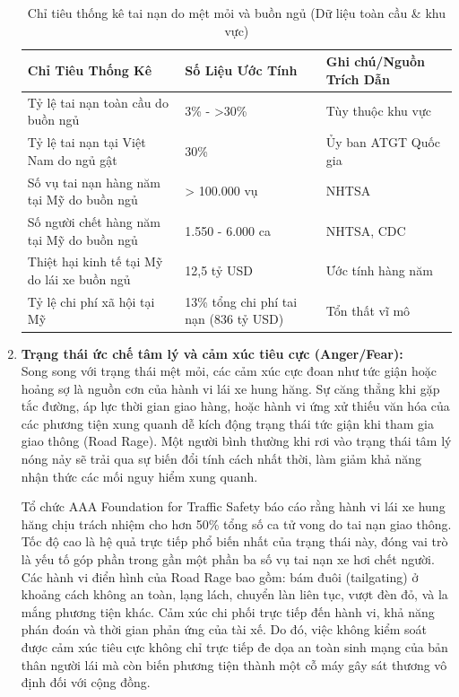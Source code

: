 \documentclass[../DoAn.tex]{subfiles}
\begin{document}
\begin{enumerate}
    \begin{table}[htbp]
    \centering
    \caption{Chỉ tiêu thống kê tai nạn do mệt mỏi và buồn ngủ (Dữ liệu toàn cầu \& khu vực)}
    \begin{tabular}{|p{6cm}|p{4cm}|p{4.5cm}|}
    \hline
    \textbf{Chỉ Tiêu Thống Kê} & \textbf{Số Liệu Ước Tính} & \textbf{Ghi chú/Nguồn Trích Dẫn} \\
    \hline
    Tỷ lệ tai nạn toàn cầu do buồn ngủ & 3\% - >30\% & Tùy thuộc khu vực \\
    \hline
    Tỷ lệ tai nạn tại Việt Nam do ngủ gật & 30\% & Ủy ban ATGT Quốc gia \\
    \hline
    Số vụ tai nạn hàng năm tại Mỹ do buồn ngủ & > 100.000 vụ & NHTSA \\
    \hline
    Số người chết hàng năm tại Mỹ do buồn ngủ & 1.550 - 6.000 ca & NHTSA, CDC \\
    \hline
    Thiệt hại kinh tế tại Mỹ do lái xe buồn ngủ & 12,5 tỷ USD & Ước tính hàng năm \\
    \hline
    Tỷ lệ chi phí xã hội tại Mỹ & 13\% tổng chi phí tai nạn (836 tỷ USD) & Tổn thất vĩ mô \\
    \hline
    \end{tabular}
    \end{table}

    \item \textbf{Trạng thái ức chế tâm lý và cảm xúc tiêu cực (Anger/Fear):}\\
    Song song với trạng thái mệt mỏi, các cảm xúc cực đoan như tức giận hoặc hoảng sợ là nguồn cơn của hành vi lái xe hung hăng. Sự căng thẳng khi gặp tắc đường, áp lực thời gian giao hàng, hoặc hành vi ứng xử thiếu văn hóa của các phương tiện xung quanh dễ kích động trạng thái tức giận khi tham gia giao thông (Road Rage). Một người bình thường khi rơi vào trạng thái tâm lý nóng nảy sẽ trải qua sự biến đổi tính cách nhất thời, làm giảm khả năng nhận thức các mối nguy hiểm xung quanh.
    
    Tổ chức AAA Foundation for Traffic Safety báo cáo rằng hành vi lái xe hung hăng chịu trách nhiệm cho hơn 50\% tổng số ca tử vong do tai nạn giao thông. Tốc độ cao là hệ quả trực tiếp phổ biến nhất của trạng thái này, đóng vai trò là yếu tố góp phần trong gần một phần ba số vụ tai nạn xe hơi chết người. Các hành vi điển hình của Road Rage bao gồm: bám đuôi (tailgating) ở khoảng cách không an toàn, lạng lách, chuyển làn liên tục, vượt đèn đỏ, và la mắng phương tiện khác. Cảm xúc chi phối trực tiếp đến hành vi, khả năng phán đoán và thời gian phản ứng của tài xế. Do đó, việc không kiểm soát được cảm xúc tiêu cực không chỉ trực tiếp đe dọa an toàn sinh mạng của bản thân người lái mà còn biến phương tiện thành một cỗ máy gây sát thương vô định đối với cộng đồng.
\end{enumerate}
\end{document}
